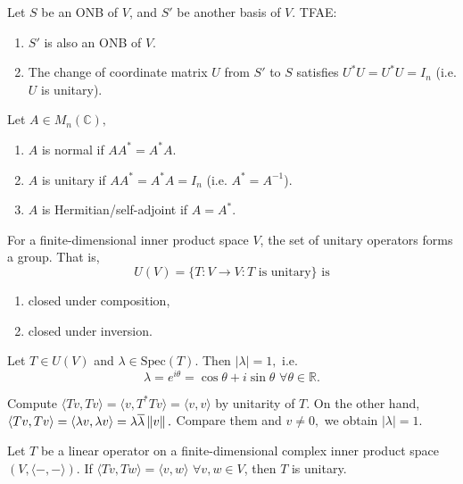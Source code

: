 \begin{theorem}
   Let $S$ be an ONB of $V$, and $S'$ be another basis of $V$. TFAE:
   \begin{enumerate}
    \item $S'$ is also an ONB of $V$.
    \item The change of coordinate matrix $U$ from $S'$ to $S$ satisfies $U^*U=U^*U=I_n$ (i.e. $U$ is unitary).
   \end{enumerate}
\end{theorem}

\begin{definition}
    Let $A\in M_n(\mathbb{C}),$
    \begin{enumerate}
        \item $A$ is normal if $AA^*=A^*A$.
        \item $A$ is unitary if $AA^*=A^*A = I_n$ (i.e. $A^*=A^{-1}$).
        \item $A$ is Hermitian/self-adjoint if $A=A^*$. 
    \end{enumerate}
\end{definition}

\begin{theorem}
    For a finite-dimensional inner product space $V$, the set of unitary operators forms a group.
    That is,
    $$U(V)=\{T:V\to V: T\text{ is unitary}\} \text{ is}$$
    \begin{enumerate}
        \item closed under composition,
        \item closed under inversion.
    \end{enumerate}
\end{theorem}

\begin{theorem}
    Let $T\in U(V)$ and $\lambda\in\mathrm{Spec}(T).$ Then $|\lambda|=1,$ i.e. 
    $$\lambda=e^{i\theta}=\cos\theta + i\sin\theta\,\, \forall\theta\in\mathbb{R}.$$
\end{theorem}

\begin{pfbox}
Compute $\langle Tv, Tv\rangle = \langle v, T^*Tv\rangle =\langle v,v\rangle$ by unitarity of $T$.
On the other hand, $\langle Tv, Tv\rangle = \langle \lambda v, \lambda v\rangle = \lambda\overline{\lambda} \left\lVert v \right\rVert.$
Compare them and $v\neq 0,$ we obtain $|\lambda| = 1.$
\end{pfbox}

\begin{lemma}
Let $T$ be a linear operator on a finite-dimensional complex inner product space
$(V,\langle -, -\rangle)$. If $\langle Tv,Tw\rangle = \langle v,w\rangle
\,\,\forall v,w\in V$, then $T$ is unitary.
\end{lemma}


